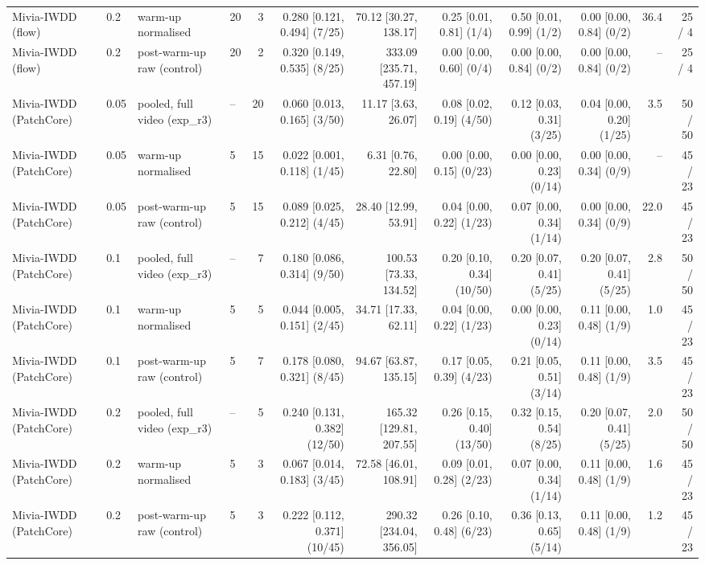 \begin{table}[t]
{\begin{tabular}{llllrrrrrrrr}
Mivia-IWDD (flow) & 0.2 & warm-up normalised & 20 & 3 & 0.280 [0.121, 0.494] (7/25) & 70.12 [30.27, 138.17] & 0.25 [0.01, 0.81] (1/4) & 0.50 [0.01, 0.99] (1/2) & 0.00 [0.00, 0.84] (0/2) & 36.4 & 25 / 4 \\
Mivia-IWDD (flow) & 0.2 & post-warm-up raw (control) & 20 & 2 & 0.320 [0.149, 0.535] (8/25) & 333.09 [235.71, 457.19] & 0.00 [0.00, 0.60] (0/4) & 0.00 [0.00, 0.84] (0/2) & 0.00 [0.00, 0.84] (0/2) & -- & 25 / 4 \\
Mivia-IWDD (PatchCore) & 0.05 & pooled, full video (exp\_r3) & -- & 20 & 0.060 [0.013, 0.165] (3/50) & 11.17 [3.63, 26.07] & 0.08 [0.02, 0.19] (4/50) & 0.12 [0.03, 0.31] (3/25) & 0.04 [0.00, 0.20] (1/25) & 3.5 & 50 / 50 \\
Mivia-IWDD (PatchCore) & 0.05 & warm-up normalised & 5 & 15 & 0.022 [0.001, 0.118] (1/45) & 6.31 [0.76, 22.80] & 0.00 [0.00, 0.15] (0/23) & 0.00 [0.00, 0.23] (0/14) & 0.00 [0.00, 0.34] (0/9) & -- & 45 / 23 \\
Mivia-IWDD (PatchCore) & 0.05 & post-warm-up raw (control) & 5 & 15 & 0.089 [0.025, 0.212] (4/45) & 28.40 [12.99, 53.91] & 0.04 [0.00, 0.22] (1/23) & 0.07 [0.00, 0.34] (1/14) & 0.00 [0.00, 0.34] (0/9) & 22.0 & 45 / 23 \\
Mivia-IWDD (PatchCore) & 0.1 & pooled, full video (exp\_r3) & -- & 7 & 0.180 [0.086, 0.314] (9/50) & 100.53 [73.33, 134.52] & 0.20 [0.10, 0.34] (10/50) & 0.20 [0.07, 0.41] (5/25) & 0.20 [0.07, 0.41] (5/25) & 2.8 & 50 / 50 \\
Mivia-IWDD (PatchCore) & 0.1 & warm-up normalised & 5 & 5 & 0.044 [0.005, 0.151] (2/45) & 34.71 [17.33, 62.11] & 0.04 [0.00, 0.22] (1/23) & 0.00 [0.00, 0.23] (0/14) & 0.11 [0.00, 0.48] (1/9) & 1.0 & 45 / 23 \\
Mivia-IWDD (PatchCore) & 0.1 & post-warm-up raw (control) & 5 & 7 & 0.178 [0.080, 0.321] (8/45) & 94.67 [63.87, 135.15] & 0.17 [0.05, 0.39] (4/23) & 0.21 [0.05, 0.51] (3/14) & 0.11 [0.00, 0.48] (1/9) & 3.5 & 45 / 23 \\
Mivia-IWDD (PatchCore) & 0.2 & pooled, full video (exp\_r3) & -- & 5 & 0.240 [0.131, 0.382] (12/50) & 165.32 [129.81, 207.55] & 0.26 [0.15, 0.40] (13/50) & 0.32 [0.15, 0.54] (8/25) & 0.20 [0.07, 0.41] (5/25) & 2.0 & 50 / 50 \\
Mivia-IWDD (PatchCore) & 0.2 & warm-up normalised & 5 & 3 & 0.067 [0.014, 0.183] (3/45) & 72.58 [46.01, 108.91] & 0.09 [0.01, 0.28] (2/23) & 0.07 [0.00, 0.34] (1/14) & 0.11 [0.00, 0.48] (1/9) & 1.6 & 45 / 23 \\
Mivia-IWDD (PatchCore) & 0.2 & post-warm-up raw (control) & 5 & 3 & 0.222 [0.112, 0.371] (10/45) & 290.32 [234.04, 356.05] & 0.26 [0.10, 0.48] (6/23) & 0.36 [0.13, 0.65] (5/14) & 0.11 [0.00, 0.48] (1/9) & 1.2 & 45 / 23 \\

\end{tabular}}
\end{table}

